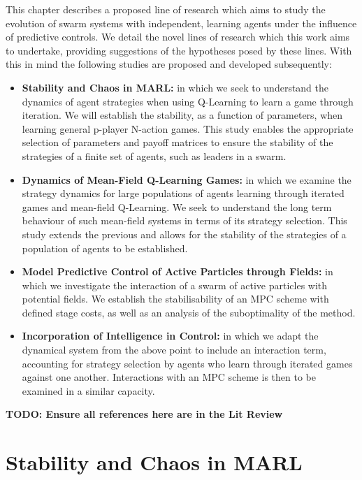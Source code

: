 \documentclass[.../main.tex]{subfiles}
\begin{document}
	This chapter describes a proposed line of research which aims to study the evolution of swarm
	systems with independent, learning agents under the influence of predictive controls. We detail
	the novel lines of research which this work aims to undertake, providing suggestions of the
	hypotheses posed by these lines. With this in mind the following studies are proposed and
	developed subsequently:

	\begin{itemize}
		\item \textbf{Stability and Chaos in MARL:} in which we seek to understand the dynamics of
		agent strategies when using Q-Learning to learn a game through iteration. We will establish
		the stability, as a function of parameters, when learning general p-player N-action games.
		This study enables the appropriate selection of parameters and payoff matrices to ensure the
		stability of the strategies of a finite set of agents, such as leaders in a swarm.
		\item \textbf{Dynamics of Mean-Field Q-Learning Games:} in which we examine the
		strategy dynamics for large populations of agents learning through iterated games and
		mean-field Q-Learning. We seek to understand the long term behaviour of such mean-field
		systems in terms of its strategy selection. This study extends the previous and allows for
		the stability of the strategies of a population of agents to be established.
		\item \textbf{Model Predictive Control of Active Particles through Fields:} in which we
		investigate the interaction of a swarm of active particles with potential fields. We
		establish the stabilisability of an MPC scheme with defined stage costs, as well as an
		analysis of the suboptimality of the method.
		\item \textbf{Incorporation of Intelligence in Control:} in which we adapt the dynamical
		system from the above point to include an interaction term, accounting for strategy
		selection by agents who learn through iterated games against one another. Interactions with
		an MPC scheme is then to be examined in a similar capacity.

	\end{itemize}


	\textbf{TODO: Ensure all references here are in the Lit Review}

    \section{Stability and Chaos in MARL} \label{sec::Chaos_in_MARL}
\end{document}
